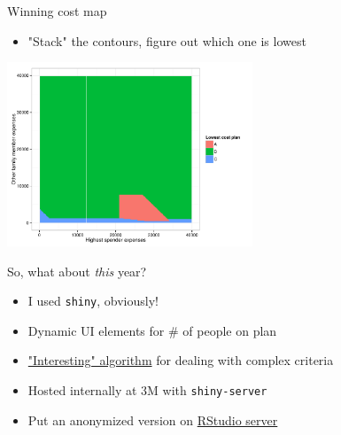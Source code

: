\documentclass[sans,aspectratio=169,presentation,bigger,fleqn]{beamer}
\begin{document}
\begin{frame}[label=sec-15]{Winning cost map}
\begin{itemize}
\item "Stack" the contours, figure out which one is lowest
\end{itemize}

\begin{center}
\includegraphics[height=5.5cm]{./img/ins-cost-map.pdf}
\end{center}
\end{frame}
\begin{frame}[fragile,label=sec-16]{So, what about \emph{this} year?}
 \begin{itemize}
\item I used \texttt{shiny}, obviously!
\item Dynamic UI elements for \# of people on plan
\item \href{http://stackoverflow.com/questions/18116967/dealing-with-conditionals-in-a-better-manner-than-deeply-nested-ifelse-blocks}{"Interesting" algorithm} for dealing with complex criteria
\item Hosted internally at 3M  with \texttt{shiny-server}
\item Put an anonymized version on \href{http://spark.rstudio.com/jwhendy/insurance-visualizer}{RStudio server}
\end{itemize}
\end{frame}
\end{document}
